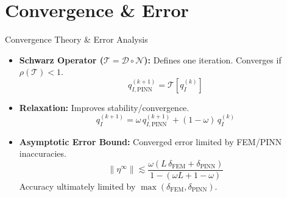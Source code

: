\documentclass{beamer}
\begin{document}
\section{Convergence \& Error}
\begin{frame}{Convergence Theory \& Error Analysis}
  \begin{itemize}
    \item \textbf{Schwarz Operator (\(\mathcal{T} = \mathcal{D} \circ \mathcal{N}\)):} Defines one iteration. Converges if \(\rho(\mathcal{T})<1\).
      \[ q_{I,\text{PINN}}^{(k+1)} = \mathcal{T}[q_I^{(k)}] \]
    \item \textbf{Relaxation:} Improves stability/convergence.
      \[ q_I^{(k+1)} = \omega\,q_{I,\text{PINN}}^{(k+1)} + (1-\omega)\,q_I^{(k)} \] 
    \item \textbf{Asymptotic Error Bound:} Converged error limited by FEM/PINN inaccuracies.
      \[ \|\eta^\infty\| \lesssim \frac{\omega (L\,\delta_{\text{FEM}} + \delta_{\text{PINN}})}{1 - (\omega L + 1-\omega)} \]
      Accuracy ultimately limited by \(\max(\delta_{\text{FEM}}, \delta_{\text{PINN}})\).
  \end{itemize}
\end{frame}

\end{document}
